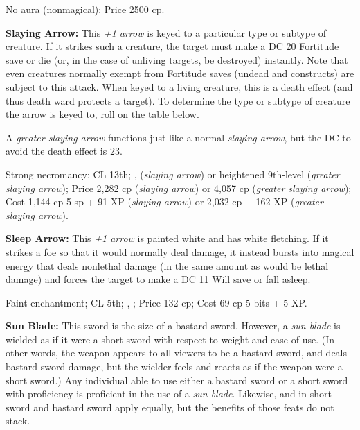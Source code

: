 No aura (nonmagical); Price 2500 cp.

\textbf{Slaying Arrow:} This \emph{+1 arrow} is keyed to a particular type or subtype of creature. If it strikes such a creature, the target must make a DC 20 Fortitude save or die (or, in the case of unliving targets, be destroyed) instantly. Note that even creatures normally exempt from Fortitude saves (undead and constructs) are subject to this attack. When keyed to a living creature, this is a death effect (and thus death ward protects a target). To determine the type or subtype of creature the arrow is keyed to, roll on the table below.

A \emph{greater slaying arrow} functions just like a normal \emph{slaying arrow}, but the DC to avoid the death effect is 23.

Strong necromancy; CL 13th; ,  (\emph{slaying arrow}) or heightened 9th-level  (\emph{greater slaying arrow}); Price 2,282 cp (\emph{slaying arrow}) or 4,057 cp (\emph{greater slaying arrow}); Cost 1,144 cp 5 sp + 91 XP (\emph{slaying arrow}) or 2,032 cp + 162 XP (\emph{greater slaying arrow}).


\textbf{Sleep Arrow:} This \emph{+1 arrow} is painted white and has white fletching. If it strikes a foe so that it would normally deal damage, it instead bursts into magical energy that deals nonlethal damage (in the same amount as would be lethal damage) and forces the target to make a DC 11 Will save or fall asleep.

Faint enchantment; CL 5th; , ; Price 132 cp; Cost 69 cp 5 bits + 5 XP.

\textbf{Sun Blade:} This sword is the size of a bastard sword. However, a \emph{sun blade} is wielded as if it were a short sword with respect to weight and ease of use. (In other words, the weapon appears to all viewers to be a bastard sword, and deals bastard sword damage, but the wielder feels and reacts as if the weapon were a short sword.) Any individual able to use either a bastard sword or a short sword with proficiency is proficient in the use of a \emph{sun blade}. Likewise,  and  in short sword and bastard sword apply equally, but the benefits of those feats do not stack.

